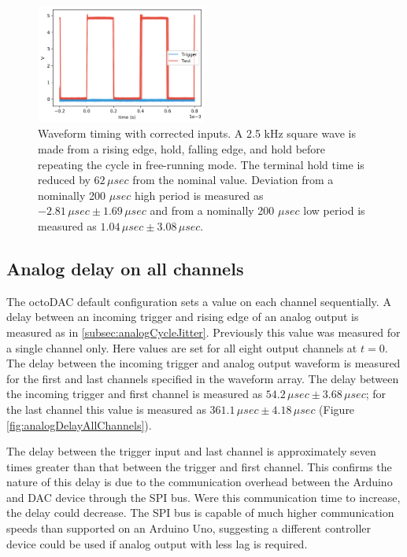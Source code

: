 \documentclass[10pt,a4paper]{article}
\begin{document}
\begin{figure}
	\centering
	\includegraphics[width=0.5\textwidth]{../output/waveformCorrected.png}
	\caption[waveformCorrected]{Waveform timing with corrected inputs. A 2.5 kHz square wave is made from a rising edge, hold, falling edge, and hold before repeating the cycle in free-running mode. The terminal hold time is reduced by $62 \, \mu sec$ from the nominal value.  Deviation from a nominally 200 $\mu sec$ high period is measured as $-2.81 \, \mu sec \pm 1.69 \, \mu sec$ and from a nominally 200 $\mu sec$ low period is measured as $1.04 \, \mu sec \pm 3.08\, \mu sec$.\newline}
	\label{fig:waveformTimingCorrected}
\end{figure} 

\subsection{Analog delay on all channels}
\label{subsec:analogDelayAllChannels}
The octoDAC default configuration sets a value on each channel sequentially.  A delay between an incoming trigger and rising edge of an analog output is measured as in \ref{subsec:analogCycleJitter}.  Previously this value was measured for a single channel only.  Here values are set for all eight output channels at $t = 0$.  The delay between the incoming trigger and analog output waveform is measured for the first and last channels specified in the waveform array.  The delay between the incoming trigger and first channel is measured as $54.2\,\mu sec \pm 3.68\,\mu sec$; for the last channel this value is measured as $361.1\,\mu sec \pm 4.18\, \mu sec$ (Figure \ref{fig:analogDelayAllChannels}). 

The delay between the trigger input and last channel is approximately seven times greater than that between the trigger and first channel.  This confirms the nature of this delay is due to the communication overhead between the Arduino and DAC device through the SPI bus.  Were this communication time to increase, the delay could decrease.  The SPI bus is capable of much higher communication speeds than supported on an Arduino Uno, suggesting a different controller device could be used if analog output with less lag is required.
\end{document}
